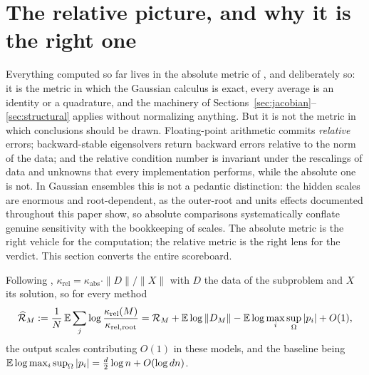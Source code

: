 \section{The relative picture, and why it is the right one}\label{sec:relative}

Everything computed so far lives in the absolute metric of
\cite{graf2026numerical,noferini2016numerical}, and deliberately so: it is the metric in
which the Gaussian calculus is exact, every average is an identity or a quadrature, and
the machinery of Sections~\ref{sec:jacobian}--\ref{sec:structural} applies without
normalizing anything. But it is not the metric in which conclusions should be drawn.
Floating-point arithmetic commits \emph{relative} errors; backward-stable eigensolvers
return backward errors relative to the norm of the data; and the relative condition
number is invariant under the rescalings of data and unknowns that every implementation
performs, while the absolute one is not. In Gaussian ensembles this is not a pedantic
distinction: the hidden scales are enormous and root-dependent, as the outer-root and
units effects documented throughout this paper show, so absolute comparisons
systematically conflate genuine sensitivity with the bookkeeping of scales. The absolute
metric is the right vehicle for the computation; the relative metric is the right lens
for the verdict. This section converts the entire scoreboard.

Following \cite[Sec.~5]{noferini2016numerical},
$\kappa_{\mathrm{rel}} = \kappa_{\mathrm{abs}}\cdot\|D\|/\|X\|$ with $D$ the data of the
subproblem and $X$ its solution, so for every method
\[
  \widehat{\mathcal{R}}_M := \frac1N\,\mathbb{E}\sum_j\log
  \frac{\kappa_{\mathrm{rel}}(M)}{\kappa_{\mathrm{rel,root}}}
  = \mathcal{R}_M + \mathbb{E}\log\|D_M\| - \mathbb{E}\log\max_i\sup_\Omega|p_i| + O(1),
\]
the output scales contributing $O(1)$ in these models, and the baseline being
$\mathbb{E}\log\max_i\sup_\Omega|p_i| = \frac d2\log n + O(\log dn)$.


